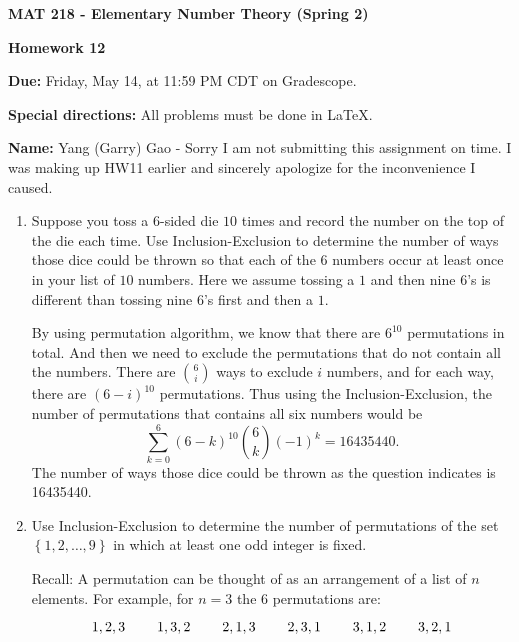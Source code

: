 \documentclass[11pt,a4paper]{article}
\begin{document}
\begin{Large}
\centerline{\bf MAT 218 - Elementary Number Theory (Spring 2)}\medskip
\centerline{\bf Homework 12}\medskip
\end{Large}
{\bf Due:} Friday, May 14, at 11:59 PM CDT on Gradescope.

{\bf Special directions:}  All problems must be done in \LaTeX.

{\bf Name:} Yang (Garry) Gao - Sorry I am not submitting this assignment on time. I was making up HW11 earlier and sincerely apologize for the inconvenience I caused. 

\hrulefill

\begin{enumerate}



	\item Suppose you toss a \(6\)-sided die \(10\) times and record the number on the top of the die each time.  Use Inclusion-Exclusion to determine the number of ways those dice could be thrown so that each of the \(6\) numbers occur at least once in your list of \(10\) numbers.  Here we assume tossing a \(1\) and then nine \(6\)'s is different than tossing nine \(6\)'s first and then a \(1\).

	By using permutation algorithm, we know that there are $6^{10}$ permutations in total. And then we need to exclude the permutations that do not contain all the numbers. There are $6 \choose i$ ways to exclude $i$ numbers, and for each way, there are $(6-i)^{10}$ permutations. Thus using the Inclusion-Exclusion, the number of permutations that contains all six numbers would be \[\sum_{k=0}^{6} (6-k)^{10} {6 \choose k} (-1)^k = 16435440.\]
	The number of ways those dice could be thrown as the question indicates is 16435440.

	\item Use Inclusion-Exclusion to determine the number of permutations of the set \(\left\{1,2,\ldots,9\right\}\) in which at least one odd integer is fixed.

	Recall: A permutation can be thought of as an arrangement of a list of \(n\) elements. For example, for \(n= 3\) the \(6\) permutations are:

	\[1,2,3 \hspace{0.8cm} 1,3,2 \hspace{0.8cm} 2,1,3 \hspace{0.8cm} 2,3,1 \hspace{0.8cm} 3,1,2 \hspace{0.8cm} 3,2,1\]


\end{enumerate}
\end{document}
